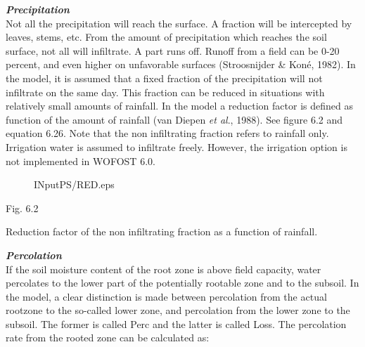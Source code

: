 {\it {\bf Precipitation}\/}\\
Not all the precipitation will reach the surface. A fraction will be intercepted by leaves,
stems, etc. From the amount of precipitation which reaches the soil surface, not all will
infiltrate. A part runs off. Runoff from a field can be 0-20 percent, and even higher on
unfavorable surfaces (Stroosnijder \& Kon\'{e}, 1982). In the model, it is assumed that a
fixed fraction of the precipitation will not infiltrate on the same day. This fraction can be
reduced in situations with relatively small amounts of rainfall. In the model a reduction
factor is defined as function of the amount of rainfall (van Diepen {\it et al\/}., 1988). See 
figure 6.2 and equation 6.26. Note that the non infiltrating fraction refers to rainfall only.
Irrigation water is assumed to infiltrate freely. However, the irrigation option is not
implemented in WOFOST 6.0.

\begin{figure}[htbp]
\begin{forcewidth}{11.06cm}
 \begin{center}INputPS{\FigDir/RED.eps} \end{center}
\end{forcewidth}
\end{figure}




















Fig. 6.2 
\testlastline

\begin{indenting}{2.54cm}
Reduction factor of the non infiltrating fraction as a function of rainfall.
\end{indenting}



{\bf {\it Percolation\/}}\\
If the soil moisture content of the root zone is above field capacity, water percolates to
the lower part of the potentially rootable zone and to the subsoil. In the model, a clear
distinction is made between percolation from the actual rootzone to the so-called lower
zone, and percolation from the lower zone to the subsoil. The former is called Perc and
the latter is called Loss. The percolation rate from the rooted zone can be calculated as:

